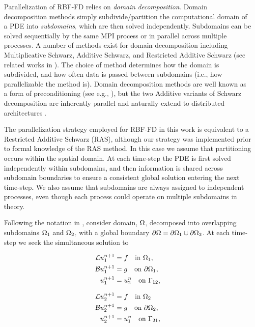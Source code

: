 \documentclass{report}
\begin{document}
Parallelization of RBF-FD relies on \emph{domain decomposition}. Domain decomposition methods simply subdivide/partition the computational domain of a PDE into \emph{subdomains}, which are then solved independently. Subdomains can be solved sequentially by the same MPI process or in parallel across multiple processes. A number of methods exist for domain decomposition including Multiplicative Schwarz, Additive Schwarz, and Restricted Additive Schwarz (see related works in \cite{Yokota2010,StCyr2007}). The choice of method determines how the domain is subdivided, and how often data is passed between subdomains (i.e., how parallelizable the method is). Domain decomposition methods are well known as a form of preconditioning (see e.g., \cite{Beatson2000, StCyr2007}), but the two Additive variants of Schwarz decomposition are inherently parallel and naturally extend to distributed architectures \cite{Yokota2010, Gropp1990}. 

The parallelization strategy employed for RBF-FD in this work is equivalent to a Restricted Additive Schwarz (RAS), although our strategy was implemented prior to formal knowledge of the RAS method. In this case we assume that partitioning occurs within the spatial domain. At each time-step the PDE is first solved independently within subdomains, and then information is shared across subdomain boundaries to ensure a consistent global solution entering the next time-step. We also assume that subdomains are always assigned to independent processes, even though each process could operate on multiple subdomains in theory. 

Following the notation in \cite{StCyr2007}, consider domain, $\Omega$, decomposed into overlapping subdomains $\Omega_1$ and $\Omega_2$, with a global boundary $\partial \Omega = \partial \Omega_1 \cup \partial \Omega_2$. At each time-step we seek the simultaneous solution to
\begin{center}
\begin{minipage}{0.4\linewidth}
\begin{align*}
\mathcal{L}u_{1}^{n+1} & = f \ \ \text{ in }\Omega_1,\\
\mathcal{B}u_{1}^{n+1} &= g \ \ \text{ on }\partial \Omega_1, \\
u_{1}^{n+1} & = u_2^{n} \ \ \text{ on }\Gamma_{12}, 
\end{align*}
\end{minipage}
\begin{minipage}{0.4\linewidth} 
\begin{align}
\mathcal{L}u_{2}^{n+1} & = f \ \ \text{ in }\Omega_2 \nonumber \\
\mathcal{B}u_{2}^{n+1} & = g \ \ \text{ on }\partial \Omega_2, \label{eq:rasm_example} \\
u_{2}^{n+1} & = u_1^{n} \ \ \text{ on }\Gamma_{21},  \nonumber
\end{align}
\end{minipage}
\end{center}
\ 
\end{document}
